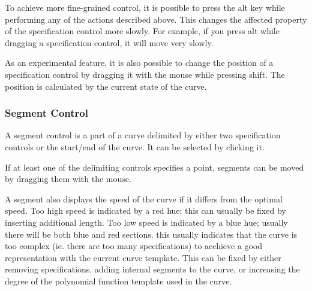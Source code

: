 \documentclass[a4paper]{article}
\begin{document}
					To achieve more fine-grained control, it is possible to press the alt key while performing any of the actions described above. This changes the affected property of the specification control more slowly. For example, if you press alt while dragging a specification control, it will move very slowly.
					
					As an experimental feature, it is also possible to change the position of a specification control by dragging it with the mouse while pressing shift. The position is calculated by the current state of the curve.
				
				\subsubsection{Segment Control}
				
					A segment control is a part of a curve delimited by either two specification controls or the start/end of the curve. It can be selected by clicking it.
					
					If at least one of the delimiting controls specifies a point, segments can be moved by dragging them with the mouse.
					
					A segment also displays the speed of the curve if it differs from the optimal speed. Too high speed is indicated by a red hue; this can usually be fixed by inserting additional length. Too low speed is indicated by a blue hue; usually there will be both blue and red sections. this usually indicates that the curve is too complex (ie. there are too many specifications) to acchieve a good representation with the current curve template. This can be fixed by either removing specifications, adding internal segments to the curve, or increasing the degree of the polynomial function template used in the curve.
				
\end{document}
